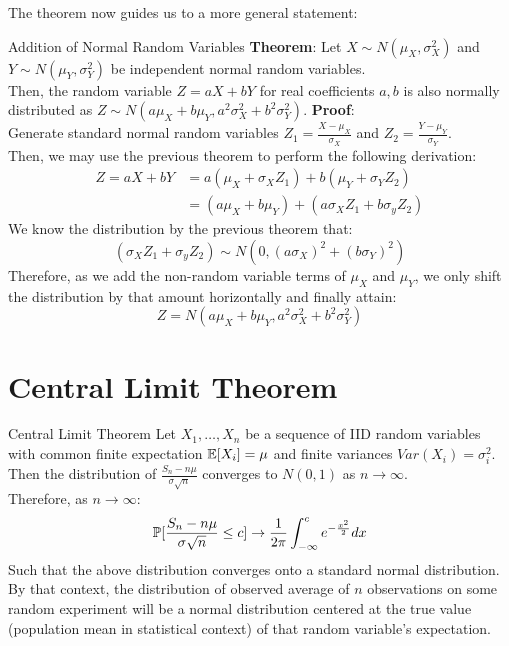 The theorem now guides us to a more general statement:
\begin{ln-theorem}{Addition of Normal Random Variables}{}
    \textbf{Theorem}: Let $X \sim N(\mu_X, \sigma_X^2)$ and $Y \sim N(\mu_Y, \sigma_Y^2)$ be independent normal random variables. \\
    Then, the random variable $Z = aX + bY$ for real coefficients $a, b$ is also normally distributed as $Z \sim N(a\mu_X + b\mu_Y, a^2 \sigma_X^2 + b^2 \sigma_Y^2)$.
    \tcblower
    \textbf{Proof}: \\
    Generate standard normal random variables $Z_1 = \frac{X - \mu_X}{\sigma_X}$ and $Z_2 = \frac{Y - \mu_Y}{\sigma_Y}$. \\
    Then, we may use the previous theorem to perform the following derivation:
    \begin{align*}
        Z = aX + bY &= a(\mu_X + \sigma_X Z_1) + b(\mu_Y + \sigma_Y Z_2) \\
        &= (a\mu_X + b\mu_Y) + (a\sigma_X Z_1 + b\sigma_y Z_2)
    \end{align*}
    We know the distribution by the previous theorem that:
    \[(\sigma_X Z_1 + \sigma_y Z_2) \sim N(0, {(a \sigma_X)}^2 + {(b\sigma_Y)}^2)\]
    Therefore, as we add the non-random variable terms of $\mu_X$ and $\mu_Y$, we only shift the distribution by that amount horizontally and finally attain:
    \[Z = N(a\mu_X + b\mu_Y, a^2 \sigma_X^2 + b^2 \sigma_Y^2)\]
\end{ln-theorem}

\section{Central Limit Theorem}
\begin{ln-theorem}{Central Limit Theorem}{}
    Let $X_1, \dots, X_n$ be a sequence of IID random variables with common finite expectation $\E[X_i] = \mu$ and finite variances $Var(X_i) = \sigma_i^2$. \\
    Then the distribution of $\frac{S_n - n\mu}{\sigma \sqrt{n}}$ converges to $N(0, 1)$ as $n \rightarrow \infty$. \\
    Therefore, as $n \rightarrow \infty$:
    \[
        \P[\frac{S_n - n\mu}{\sigma \sqrt{n}} \leq c] \rightarrow \frac{1}{2\pi} \int_{-\infty}^c e^{-\frac{x^2}{2}} dx
    \]
    Such that the above distribution converges onto a standard normal distribution. \\
    By that context, the distribution of observed average of $n$ observations on some random experiment will be a normal distribution centered at the true value (population mean in statistical context) of that random variable's expectation.
\end{ln-theorem}
